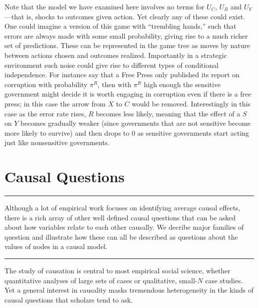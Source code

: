 \documentclass[
  12pt,
]{book}
\begin{document}
Note that the model we have examined here involves no terms for \(U_C\), \(U_R\) and \(U_Y\)---that is, shocks to outcomes given action. Yet clearly any of these could exist. One could imagine a version of this game with ``trembling hands,'' such that errors are always made with some small probability, giving rise to a much richer set of predictions. These can be represented in the game tree as moves by nature between actions chosen and outcomes realized. Importantly in a strategic environment such noise could give rise to different types of conditional independence. For instance say that a Free Press only published its report on corruption with probability \(\pi^R\), then with \(\pi^R\) high enough the sensitive government might decide it is worth engaging in corruption even if there is a free press; in this case the arrow from \(X\) to \(C\) would be removed. Interestingly in this case as the error rate rises, \(R\) becomes less likely, meaning that the effect of a \(S\) on \(Y\) becomes gradually weaker (since governments that are not sensitive become more likely to survive) and then drops to 0 as sensitive governments start acting just like nonsensitive governments.

\hypertarget{questions}{%
\chapter{Causal Questions}\label{questions}}

\begin{center}\rule{0.5\linewidth}{0.5pt}\end{center}

Although a lot of empirical work focuses on identifying average causal effects, there is a rich array of other well defined causal questions that can be asked about how variables relate to each other causally. We decribe major families of question and illustrate how these can all be described as questions about the values of nodes in a causal model.

\begin{center}\rule{0.5\linewidth}{0.5pt}\end{center}

The study of causation is central to most empirical social science, whether quantitative analyses of large sets of cases or qualitative, small-\(N\) case studies. Yet a general interest in causality masks tremendous heterogeneity in the kinds of causal questions that scholars tend to ask.
\end{document}
